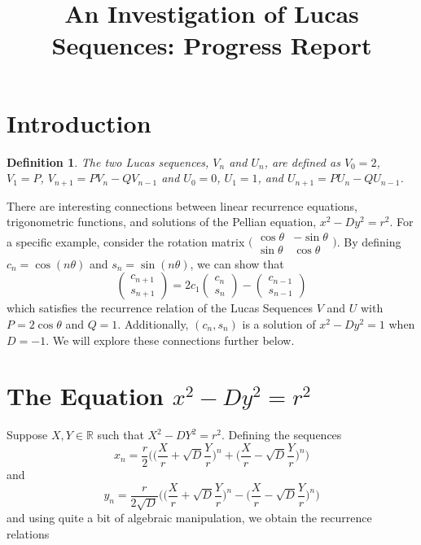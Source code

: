\documentclass{article}
\newtheorem{definition}{Definition}
\begin{document}
\title{An Investigation of Lucas Sequences: Progress Report}

\maketitle

\section{Introduction}

\begin{definition}
	The two Lucas sequences, $V_n$ and $U_n$, are defined as $V_0 = 2$, $V_1 = P$, $V_{n+1} = PV_n - QV_{n-1}$  and $U_0 = 0$, $U_1 = 1$, and $U_{n+1} = PU_n - QU_{n-1}$.
\end{definition}

There are interesting connections between linear recurrence equations, trigonometric functions, and solutions of the Pellian equation, $x^2 - Dy^2 = r^2$. For a specific example, consider the rotation matrix $\bigg ( \begin{smallmatrix} \cos \theta & -\sin \theta \\ \sin \theta & \cos \theta \end{smallmatrix} \bigg )$. By defining $c_n = \cos(n\theta)$ and $s_n = \sin(n\theta)$, we can show that $$ \begin{pmatrix} c_{n+1} \\ s_{n+1} \end{pmatrix} = 2c_1 \begin{pmatrix} c_n \\ s_n \end{pmatrix} - \begin{pmatrix} c_{n-1} \\ s_{n-1} \end{pmatrix} $$ which satisfies the recurrence relation of the Lucas Sequences $V$ and $U$ with $P = 2\cos \theta$ and $Q = 1$. Additionally, $(c_n, s_n)$ is a solution of $x^2 - Dy^2 = 1$ when $D = -1$. We will explore these connections further below.

\section{The Equation $x^2 - Dy^2 = r^2$}

Suppose $X,Y \in \mathbb{R}$ such that $X^2 - DY^2 = r^2$. Defining the sequences $$x_n = \frac{r}{2}\bigg ( \bigg (\frac{X}{r} + \sqrt{D}\frac{Y}{r}\bigg )^n + \bigg ( \frac{X}{r} - \sqrt{D}\frac{Y}{r} \bigg )^n \bigg )$$ and $$ y_n = \frac{r}{2\sqrt{D}} \bigg ( \bigg (\frac{X}{r} + \sqrt{D}\frac{Y}{r} \bigg )^n - \bigg (\frac{X}{r} - \sqrt{D}\frac{Y}{r} \bigg )^n \bigg )$$ and using quite a bit of algebraic manipulation, we obtain the recurrence relations
\end{document}

